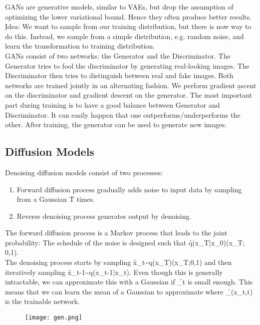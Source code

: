GANs are generative models, similar to VAEs, but drop the assumption of optimizing the lower variational bound. Hence they often produce better results.\\
\b{Idea:} We want to sample from our training distribution, but there is now way to do this. Instead, we sample from a simple distribution, e.g. random noise, and learn the transformation to training distribution.\\

GANs consist of two networks: the Generator and the Discriminator. The Generator tries to fool the discriminator by generating real-looking images. The Discriminator then tries to distinguish between real and fake images. Both networks are trained jointly in an alternating fashion. We perform gradient \b{ascent} on the discriminator and gradient descent on the generator. The most important part during training is to have a good balance between Generator and Discriminator. It can easily happen that one outperforms/underperforms the other. After training, the generator can be used to generate new images.

\subsection{Diffusion Models}
Denoising diffusion models consist of two processes:
\begin{enumerate}
    \item Forward diffusion process gradually adds noise to input data by sampling from a Gaussian \f{T} times.
    \item Reverse denoising process generates output by denoising.
\end{enumerate}

The forward diffusion process is a Markov process that leads to the joint probability:
The schedule of the noise is designed such that \f{q(x_T|x_0)\approx{}(x_T; 0,1)}.\\

The denoising process starts by sampling \f{x_t\sim q(x_T)\approx{}(x_T;0,1)} and then iteratively sampling \f{x_{t-1}\sim q(x_{t-1}|x_t)}. Even though this is generally intractable, we can approximate this with a Gaussian if \f{\beta_t} is small enough. This means that we can learn the mean of a Gaussian to approximate  where \f{\mu_\theta(x_t,t)} is the trainable network.

\begin{figure}[h!]
    \centering
    \texttt{[image: gen.png]}
\end{figure}